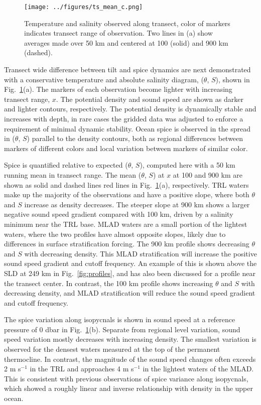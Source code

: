 \documentclass[preprint,NumberedRefs]{JASA}
\begin{document}
\begin{figure}
\texttt{[image: ../figures/ts\_mean\_c.png]}
    \caption{\label{fig:ts_diagram}{Temperature and salinity observed along transect, color of markers indicates transect range of observation. Two lines in (a) show averages made over 50 km and centered at 100 (solid) and 900 km (dashed).}}
\end{figure}
Transect wide difference between tilt and spice dynamics are next demonstrated with a conservative temperature and absolute salinity diagram\cite{TEOS10}, ($\theta$, $S$), shown in Fig.~\ref{fig:ts_diagram}(a). The markers of each observation become lighter with increasing transect range, $x$. The potential density and sound speed are shown as darker and lighter contours, respectively. The potential density is dynamically stable and increases with depth, in rare cases the gridded data was adjusted to enforce a requirement of minimal dynamic stability\citep{barker2017stabilizing}. Ocean spice is observed in the spread in ($\theta$, $S$) parallel to the density contours, both as regional differences between markers of different colors and local variation between markers of similar color.

Spice is quantified relative to expected ($\theta$, $S$), computed here with a 50 km running mean in transect range. The mean ($\theta$, $S$) at $x$ at 100 and 900 km are shown as solid and dashed lines red lines in Fig.~\ref{fig:ts_diagram}(a), respectively. TRL waters make up the majority of the observations and have a positive slope, where both $\theta$ and $S$ increase as density decreases. The steeper slope at 900 km shows a larger negative sound speed gradient compared with 100 km, driven by a salinity minimum near the TRL base. MLAD waters are a small portion of the lightest waters, where the two profiles have almost opposite slopes, likely due to differences in surface stratification forcing\cite{colosi2020observations}. The 900 km profile shows decreasing $\theta$ and $S$ with decreasing density. This MLAD stratification will increase the positive sound speed gradient and cutoff frequency. An example of this is shown above the SLD at 249 km in Fig.~\ref{fig:profiles}, and has also been discussed for a profile near the transect center.\cite{colosi2020observations} In contrast, the 100 km profile shows increasing $\theta$ and $S$ with decreasing density, and MLAD stratification will reduce the sound speed gradient and cutoff frequency.

The spice variation along isopycnals is shown in sound speed at a reference pressure of 0 dbar in Fig.~\ref{fig:ts_diagram}(b). Separate from regional level variation, sound speed variation mostly decreases with increasing density. The smallest variation is observed for the densest waters measured at the top of the permanent thermocline\cite{cole2010seasonal}. In contrast, the magnitude of the sound speed changes often exceeds 2 m s$^{-1}$ in the TRL and approaches 4 m s$^{-1}$ in the lightest waters of the MLAD. This is consistent with previous observations of spice variance along isopycnals, which showed a roughly linear and inverse relationship with density in the upper ocean\cite{ferrari2000}.
\end{document}
